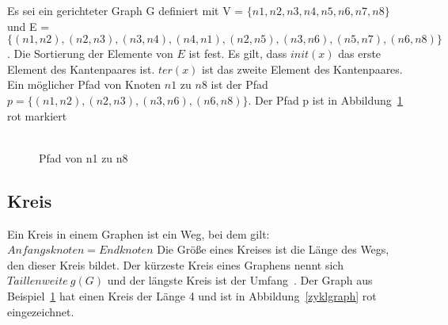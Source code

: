 \begin{example}
    Es sei ein gerichteter Graph G definiert mit V = $\{n1,n2,n3,n4,n5,n6,n7,n8\}$ und E = $\{(n1,n2),(n2,n3),(n3,n4),(n4,n1),(n2,n5),(n3,n6),(n5,n7),(n6,n8)\}$.
    Die Sortierung der Elemente von $E$ ist fest.
    Es gilt, dass $init(x)$ das erste Element des Kantenpaares ist.
    $ter(x)$ ist das zweite Element des Kantenpaares.
    Ein möglicher Pfad von Knoten $n1$ zu $n8$ ist der Pfad $p = \{(n1, n2), (n2, n3), (n3, n6), (n6, n8)\}$.
    Der Pfad p ist in Abbildung~\ref{pfadbsp} rot markiert \\ \\
\end{example}

\begin{figure}[H]
    \begin{center}
    \end{center}
    \caption{Pfad von n1 zu n8}
    \label{pfadbsp}
\end{figure}

\subsection{Kreis}

Ein Kreis in einem Graphen ist ein Weg, bei dem gilt: $Anfangsknoten = Endknoten$ \cite[vgl. S. 8]{graphentheorie}
Die Größe eines Kreises ist die Länge des Wegs, den dieser Kreis bildet.
Der kürzeste Kreis eines Graphens nennt sich $Taillenweite~g(G)$ und der längste Kreis ist der Umfang~\cite[vgl. S.8]{graphentheorie}.
Der Graph aus Beispiel~\ref{pfadbsp} hat einen Kreis der Länge 4 und ist in Abbildung~\ref{zyklgraph} rot eingezeichnet.

